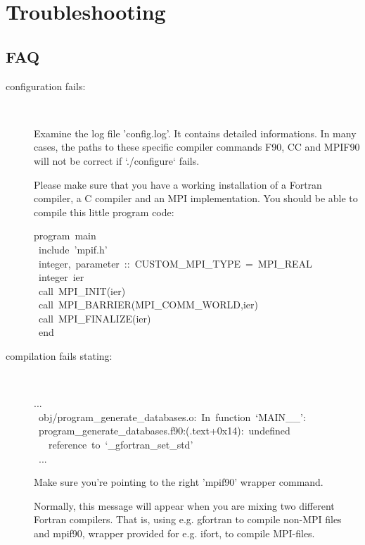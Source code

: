 \chapter{Troubleshooting}\label{cha:Troubleshooting}


\section*{FAQ}
\begin{description}
\item [{configuration fails:}]~


Examine the log file 'config.log'. It contains detailed informations.
In many cases, the paths to these specific compiler commands F90,
CC and MPIF90 will not be correct if `./configure` fails.


Please make sure that you have a working installation of a Fortran
compiler, a C compiler and an MPI implementation. You should be able
to compile this little program code:
\begin{lyxcode}
program~main~~~\\
~include~'mpif.h'~~~\\
~integer,~parameter~::~CUSTOM\_MPI\_TYPE~=~MPI\_REAL~~~\\
~integer~ier~~~\\
~call~MPI\_INIT(ier)~~~\\
~call~MPI\_BARRIER(MPI\_COMM\_WORLD,ier)~~~\\
~call~MPI\_FINALIZE(ier)~~~\\
~end
\end{lyxcode}
\item [{compilation fails stating:}] ~\\


\begin{lyxcode}
...~~~\\
~obj/program\_generate\_databases.o:~In~function~`MAIN\_\_':~~~\\
~program\_generate\_databases.f90:(.text+0x14):~undefined~\\~~~reference~to~`\_gfortran\_set\_std'~~~\\
~...~~~\\

\end{lyxcode}

Make sure you're pointing to the right 'mpif90' wrapper command.


Normally, this message will appear when you are mixing two different
Fortran compilers. That is, using e.g. gfortran to compile non-MPI
files and mpif90, wrapper provided for e.g. ifort, to compile MPI-files.



\end{description}
